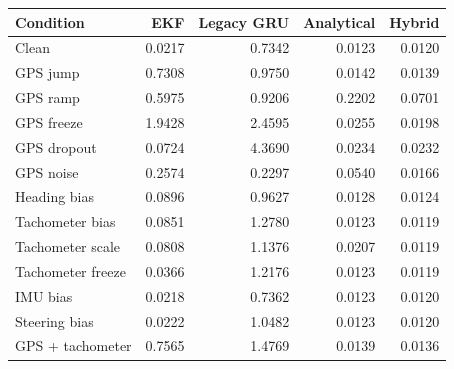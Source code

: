 \begin{tabular}{lrrrr}
\toprule
Condition & EKF & Legacy GRU & Analytical & Hybrid \\
\midrule
Clean & 0.0217 & 0.7342 & 0.0123 & 0.0120 \\
GPS jump & 0.7308 & 0.9750 & 0.0142 & 0.0139 \\
GPS ramp & 0.5975 & 0.9206 & 0.2202 & 0.0701 \\
GPS freeze & 1.9428 & 2.4595 & 0.0255 & 0.0198 \\
GPS dropout & 0.0724 & 4.3690 & 0.0234 & 0.0232 \\
GPS noise & 0.2574 & 0.2297 & 0.0540 & 0.0166 \\
Heading bias & 0.0896 & 0.9627 & 0.0128 & 0.0124 \\
Tachometer bias & 0.0851 & 1.2780 & 0.0123 & 0.0119 \\
Tachometer scale & 0.0808 & 1.1376 & 0.0207 & 0.0119 \\
Tachometer freeze & 0.0366 & 1.2176 & 0.0123 & 0.0119 \\
IMU bias & 0.0218 & 0.7362 & 0.0123 & 0.0120 \\
Steering bias & 0.0222 & 1.0482 & 0.0123 & 0.0120 \\
GPS + tachometer & 0.7565 & 1.4769 & 0.0139 & 0.0136 \\
\bottomrule
\end{tabular}
